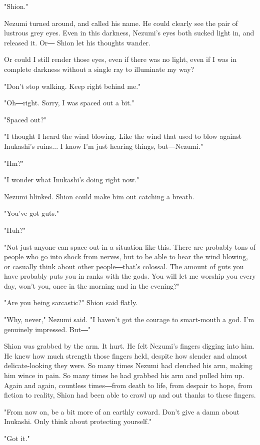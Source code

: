 "Shion."

Nezumi turned around, and called his name. He could clearly see the pair
of lustrous grey eyes. Even in this darkness, Nezumi's eyes both sucked
light in, and released it. Or― Shion let his thoughts wander.

Or could I still render those eyes, even if there was no light, even if
I was in complete darkness without a single ray to illuminate my way?

"Don't stop walking. Keep right behind me."

"Oh―right. Sorry, I was spaced out a bit."

"Spaced out?"

"I thought I heard the wind blowing. Like the wind that used to blow
against Inukashi's ruins... I know I'm just hearing things, but―Nezumi."

"Hm?"

"I wonder what Inukashi's doing right now."

Nezumi blinked. Shion could make him out catching a breath.

"You've got guts."

"Huh?"

"Not just anyone can space out in a situation like this. There are
probably tons of people who go into shock from nerves, but to be able to
hear the wind blowing, or casually think about other people―that's
colossal. The amount of guts you have probably puts you in ranks with
the gods. You will let me worship you every day, won't you, once in the
morning and in the evening?"

"Are you being sarcastic?" Shion said flatly.

"Why, never," Nezumi said. "I haven't got the courage to smart-mouth a
god. I'm genuinely impressed. But―"

Shion was grabbed by the arm. It hurt. He felt Nezumi's fingers digging
into him. He knew how much strength those fingers held, despite how
slender and almost delicate-looking they were. So many times Nezumi had
clenched his arm, making him wince in pain. So many times he had grabbed
his arm and pulled him up. Again and again, countless times―from death
to life, from despair to hope, from fiction to reality, Shion had been
able to crawl up and out thanks to these fingers.

"From now on, be a bit more of an earthly coward. Don't give a damn
about Inukashi. Only think about protecting yourself."

"Got it."


